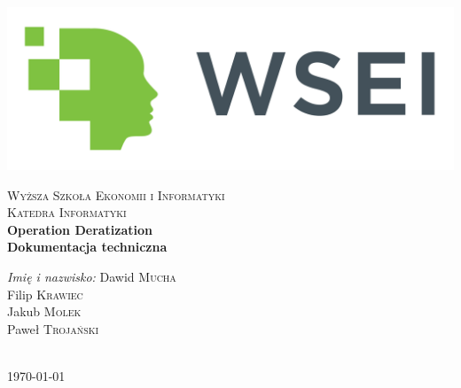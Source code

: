 \begin{titlepage}

\begin{center}

\includegraphics[scale=0.08]{Images/logo_wsei.jpg}

\textsc{Wyższa Szkoła Ekonomii i Informatyki}\\[0.2cm]
\vspace{2cm}
\textsc{Katedra Informatyki}\\[1cm]

{\huge \bfseries Operation Deratization}\\[1cm]

\textbf{Dokumentacja techniczna}\\[1cm]

\vfill

\begin{minipage}{0.8\textwidth}
\begin{flushleft}
{\large \emph{Imię i nazwisko:}  \hfill Dawid \textsc{Mucha}} \\[0.05cm]
{\large \emph{}  \hfill Filip \textsc{Krawiec}} \\[0.05cm]
{\large \emph{}  \hfill Jakub \textsc{Molek}} \\[0.05cm]
{\large \emph{}  \hfill Paweł \textsc{Trojański}} \\[0.05cm]
\end{flushleft}
\end{minipage}\\[2cm]

\large{\today}

\end{center}

\end{titlepage}
